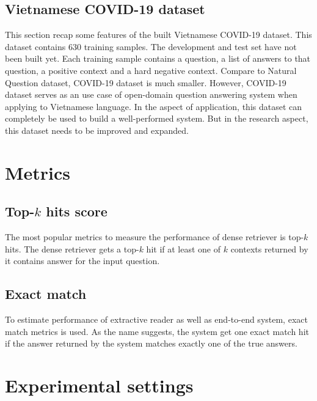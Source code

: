 \documentclass[12pt, sort&compress]{report}
\begin{document}
\subsection{Vietnamese COVID-19 dataset}
\label{sec:4.1.2}
This section recap some features of the built Vietnamese COVID-19 dataset. This dataset contains 630 training samples. The development and test set have not been built yet. Each training sample contains a question, a list of answers to that question, a positive context and a hard negative context. Compare to Natural Question dataset, COVID-19 dataset is much smaller. However, COVID-19 dataset serves as an use case of open-domain question answering system when applying to Vietnamese language. In the aspect of application, this dataset can completely be used to build a well-performed system. But in the research aspect, this dataset needs to be improved and expanded. 
\section{Metrics}
\label{sec:4.2}
\subsection{Top-$k$ hits score}
\label{sec:4.2.1}
The most popular metrics to measure the performance of dense retriever is top-$k$ hits. The dense retriever gets a top-$k$ hit if at least one of $k$ contexts returned by it contains answer for the input question. 
\subsection{Exact match}
\label{sec:4.2.2}
To estimate performance of extractive reader as well as end-to-end system, exact match metrics is used. As the name suggests, the system get one exact match hit if the answer returned by the system matches exactly one of the true answers. 
\section{Experimental settings}
\label{sec:4.3}
\end{document}
